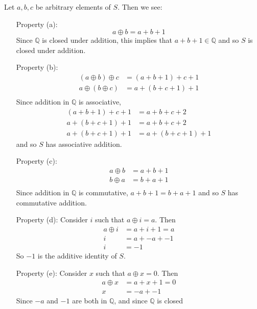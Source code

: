 \documentclass{article}
\begin{document}
\begin{enumerate}
			Let $a, b, c$ be arbitrary elements of $S$. Then we see:

			\begin{enumerate}
				\item [Property (a):] 
					\begin{equation}
						a \oplus b = a + b + 1 
					\end{equation}
					Since $\mathbb{Q}$ is closed under addition, this implies that $a + b + 1 \in 
					\mathbb{Q}$ and so $S$ is closed under addition.
				\item [Property (b):]
					\begin{align*}
						(a \oplus b) \oplus c & = (a + b + 1) + c + 1 \\
						a \oplus (b \oplus c) & = a + (b + c + 1) + 1 \\
					\end{align*}
					Since addition in $\mathbb{Q}$ is associative,
					\begin{align*}
						(a + b + 1) + c + 1 & = a + b + c + 2 \\
						a + (b + c + 1) + 1 & = a + b + c + 2 \\
						a + (b + c + 1) + 1 & = a + (b + c + 1) + 1
					\end{align*}
					and so $S$ has associative addition.
				\item [Property (c):]
					\begin{align*}
						a \oplus b & = a + b + 1 \\
						b \oplus a & = b + a + 1 \\
					\end{align*}
					Since addition in $\mathbb{Q}$ is commutative, $a + b + 1 = b + a + 1$ and so
					$S$ has commutative addition.
				\item [Property (d):]
					Consider $i$ such that $a \oplus i = a$. Then
					\begin{align*}
						a \oplus i & = a + i + 1 = a\\
						i & = a + -a + -1 \\
						i & = -1
					\end{align*}
					So $-1$ is the additive identity of $S$.
				\item [Property (e):]
					Consider $x$ such that $a \oplus x = 0$. Then
					\begin{align*}
						a \oplus x & = a + x + 1 = 0 \\
						x & = -a + -1
					\end{align*}
					Since $-a$ and $-1$ are both in $\mathbb{Q}$, and since $\mathbb{Q}$ is closed

\end{enumerate}
\end{enumerate}
\end{document}
